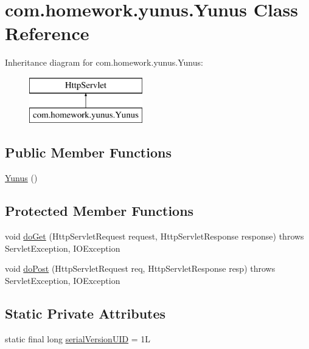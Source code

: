 \hypertarget{classcom_1_1homework_1_1yunus_1_1_yunus}{}\section{com.\+homework.\+yunus.\+Yunus Class Reference}
\label{classcom_1_1homework_1_1yunus_1_1_yunus}
Inheritance diagram for com.\+homework.\+yunus.\+Yunus\+:\begin{figure}[H]
\begin{center}
\leavevmode
\includegraphics[height=2.000000cm]{classcom_1_1homework_1_1yunus_1_1_yunus}
\end{center}
\end{figure}
\subsection*{Public Member Functions}
\begin{DoxyCompactItemize}
\item 
\hyperlink{classcom_1_1homework_1_1yunus_1_1_yunus_a9d5871f9e874380b129c6dff31f1531b}{Yunus} ()
\end{DoxyCompactItemize}
\subsection*{Protected Member Functions}
\begin{DoxyCompactItemize}
\item 
void \hyperlink{classcom_1_1homework_1_1yunus_1_1_yunus_a2653e3f269da80881e2abfa6b30dc708}{do\+Get} (Http\+Servlet\+Request request, Http\+Servlet\+Response response)  throws Servlet\+Exception, I\+O\+Exception 
\item 
void \hyperlink{classcom_1_1homework_1_1yunus_1_1_yunus_abe7ecc6a6e297a44a50731348270ae17}{do\+Post} (Http\+Servlet\+Request req, Http\+Servlet\+Response resp)  throws Servlet\+Exception, I\+O\+Exception 
\end{DoxyCompactItemize}
\subsection*{Static Private Attributes}
\begin{DoxyCompactItemize}
\item 
static final long \hyperlink{classcom_1_1homework_1_1yunus_1_1_yunus_a135ed76b5ead6a58aa5f941be9477ed1}{serial\+Version\+U\+ID} = 1L
\end{DoxyCompactItemize}



